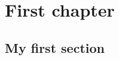 \documentclass{wfrp}
\begin{document}
\chapter{First chapter }

\section{My first section}
\lipsum[1-20]
\end{document}
